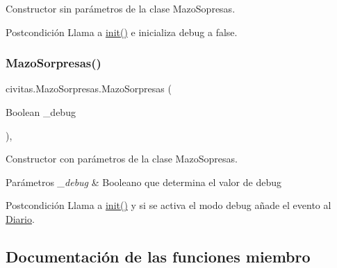 Constructor sin parámetros de la clase Mazo\+Sopresas. 

\begin{DoxyPostcond}{Postcondición}
Llama a \hyperlink{classcivitas_1_1MazoSorpresas_a8a5c58c8a162c9da0088678f3803c7dd}{init()} e inicializa debug a false. 
\end{DoxyPostcond}
\mbox{\label{classcivitas_1_1MazoSorpresas_a2768aba34debb139a79b22c6593e9acf}} 
\subsubsection{\texorpdfstring{Mazo\+Sorpresas()}{MazoSorpresas()}\hspace{0.1cm}{\footnotesize\ttfamily [2/2]}}
{\footnotesize\ttfamily civitas.\+Mazo\+Sorpresas.\+Mazo\+Sorpresas (\begin{DoxyParamCaption}\item[{Boolean}]{\+\_\+debug }\end{DoxyParamCaption})\hspace{0.3cm}{\ttfamily [inline]}, {\ttfamily [package]}}



Constructor con parámetros de la clase Mazo\+Sopresas. 


\begin{DoxyParams}{Parámetros}
{\em \+\_\+debug} & Booleano que determina el valor de debug \\
\hline
\end{DoxyParams}
\begin{DoxyPostcond}{Postcondición}
Llama a \hyperlink{classcivitas_1_1MazoSorpresas_a8a5c58c8a162c9da0088678f3803c7dd}{init()} y si se activa el modo debug añade el evento al \hyperlink{classcivitas_1_1Diario}{Diario}. 
\end{DoxyPostcond}


\subsection{Documentación de las funciones miembro}
\mbox{\label{classcivitas_1_1MazoSorpresas_a36fbdb305c6555817f1078dec430eddb}} 
